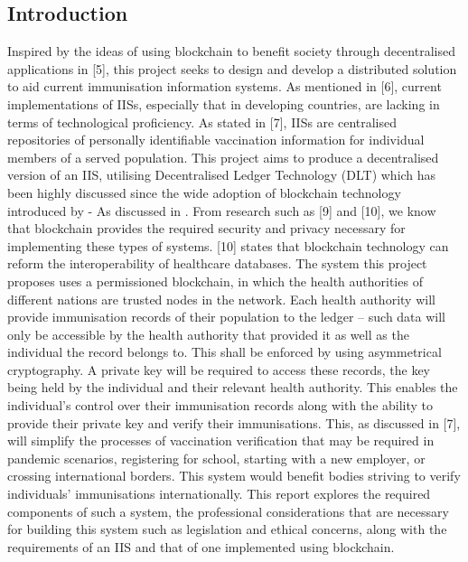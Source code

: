 \documentclass{report}
\begin{document}
\begin{flushleft}
\chapter{Introduction} %
Inspired by the ideas of using blockchain to benefit society
through decentralised applications in [5], this project seeks to
design and develop a distributed solution to aid current
immunisation information systems. As mentioned in [6],
current implementations of IISs, especially that in developing
countries, are lacking in terms of technological proficiency.
As stated in [7], IISs are centralised repositories of personally
identifiable vaccination information for individual members of
a served population. This project aims to produce a
decentralised version of an IIS, utilising Decentralised Ledger Technology (DLT) 
which has been highly discussed since the wide adoption of blockchain technology introduced by \cite{nakamoto_bitcoin_2019} - As discussed in \cite{sunyaev_distributed_2020}.
From research such as [9] and [10], we know that blockchain provides the
required security and privacy necessary for implementing
these types of systems. [10] states that blockchain technology
can reform the interoperability of healthcare databases.
The system this project proposes uses a permissioned
blockchain, in which the health authorities of different nations
are trusted nodes in the network. Each health authority will
provide immunisation records of their population to the ledger
– such data will only be accessible by the health authority that
provided it as well as the individual the record belongs to.
This shall be enforced by using asymmetrical cryptography. A
private key will be required to access these records, the key
being held by the individual and their relevant health
authority. This enables the individual’s control over their
immunisation records along with the ability to provide their
private key and verify their immunisations. This, as discussed
in [7], will simplify the processes of vaccination verification
that may be required in pandemic scenarios, registering for
school, starting with a new employer, or crossing international
borders. This system would benefit bodies striving to verify
individuals’ immunisations internationally.
This report explores the required components of such a
system, the professional considerations that are necessary for
building this system such as legislation and ethical concerns,
along with the requirements of an IIS and that of one
implemented using blockchain.



\end{flushleft}
\end{document}

